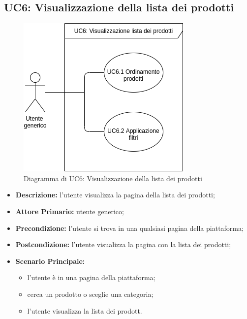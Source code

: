 \subsection{UC6: Visualizzazione della lista dei prodotti}
        \label{sec:UC8}
        \begin{figure}[!ht]
            \caption{Diagramma di UC6: Visualizzazione della lista dei prodotti}
            \vspace{10px}
            \includegraphics[scale=0.5]{../../../Images/AnalisiRequisiti/UC6.png}
            \centering
        \end{figure}
        \begin{itemize}
            \item \textbf{Descrizione:} l'utente visualizza la pagina della lista dei prodotti;
            \item \textbf{Attore Primario:} utente generico;
            \item \textbf{Precondizione:} l'utente si trova in una qualsiasi pagina della piattaforma;
            \item \textbf{Postcondizione:} l'utente visualizza la pagina con la lista dei prodotti;
            \item \textbf{Scenario Principale:}
            \begin{itemize}
                \item l'utente è in una pagina della piattaforma;
                \item cerca un prodotto o sceglie una categoria;
                \item l'utente visualizza la lista dei prodott.
            \end{itemize}
        \end{itemize}
